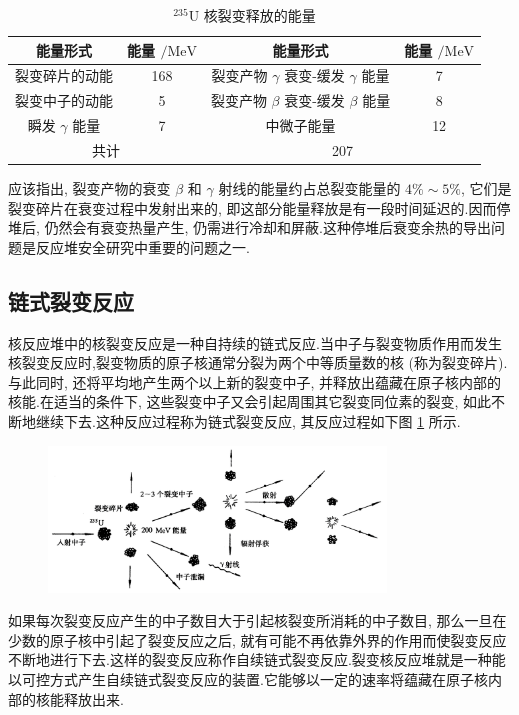 \documentclass{Sichuan Normal University}
\begin{document}
\begin{table}[H]
    \caption{${ }^{235} \mathrm{U}$ 核裂变释放的能量}
    \label{tab:核裂变释放的能量}
    \centering
    \begin{tabular}{cc|cc}
        \toprule 
        能量形式 & 能量 $/ \mathrm{MeV}$ & 能量形式 & 能量 $/ \mathrm{MeV}$\\
        \midrule 
        裂变碎片的动能 & 168 & 裂变产物 $\gamma$ 衰变-缓发 $\gamma$ 能量 & 7\\
        裂变中子的动能 & 5 & 裂变产物 $\beta$ 衰变-缓发 $\beta$ 能量 & 8\\
        瞬发 $\gamma$ 能量 & 7 & 中微子能量 & 12\\
        \midrule
        \multicolumn{2}{c}{共计} & \multicolumn{2}{c}{207} \\
        \bottomrule
    \end{tabular}
\end{table}
    
应该指出, 裂变产物的衰变 $\beta$ 和 $\gamma$ 射线的能量约占总裂变能量的 $4 \% \sim 5 \%$, 它们是裂变碎片在衰变过程中发射出来的, 即这部分能量释放是有一段时间延迟的.因而停堆后, 仍然会有衰变热量产生, 仍需进行冷却和屏蔽.这种停堆后衰变余热的导出问题是反应堆安全研究中重要的问题之一.

\subsection{链式裂变反应}

核反应堆中的核裂变反应是一种自持续的链式反应.当中子与裂变物质作用而发生核裂变反应时,裂变物质的原子核通常分裂为两个中等质量数的核 (称为裂变碎片).与此同时, 还将平均地产生两个以上新的裂变中子, 并释放出蕴藏在原子核内部的核能.在适当的条件下, 这些裂变中子又会引起周围其它裂变同位素的裂变, 如此不断地继续下去.这种反应过程称为链式裂变反应, 其反应过程如下图 \ref{fig:链式裂变反应} 所示.
\begin{figure}[H]
    \centering
    \includegraphics[width=0.8\textwidth]{./figure/链式裂变反应示意图.png}
    \label{fig:链式裂变反应}
    \end{figure}
如果每次裂变反应产生的中子数目大于引起核裂变所消耗的中子数目, 那么一旦在少数的原子核中引起了裂变反应之后, 就有可能不再依靠外界的作用而使裂变反应不断地进行下去.这样的裂变反应称作自续链式裂变反应.裂变核反应堆就是一种能以可控方式产生自续链式裂变反应的装置.它能够以一定的速率将蕴藏在原子核内部的核能释放出来.
\end{document}

